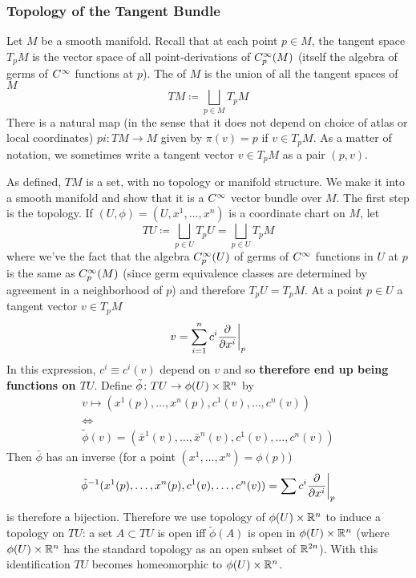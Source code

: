 \subsubsection{Topology of the Tangent Bundle}

Let \(M\) be a smooth manifold.
Recall that at each point \(p \in M\), the tangent space \(T_p M\) is the vector space of all point-derivations of \(C^\infty_p (M)\) (itself the algebra of germs of \(C^\infty\) functions at \(p\)).
The  of \(M\) is the union of all the tangent spaces of \(M\)
\[
    TM \coloneqq \bigsqcup_{p \in M} T_p M
\]
There is a natural map (in the sense that it does not depend on choice of atlas or local coordinates) \(pi \colon TM \rightarrow M\) given by \(\pi(v) = p\) if \(v \in T_p M\).
As a matter of notation, we sometimes write a tangent vector \(v \in T_p M\) as a pair \((p, v)\).

As defined, \(TM\) is a set, with no topology or manifold structure.
We make it into a smooth manifold and show that it is a \(C^\infty\) vector bundle over \(M\).
The first step is the topology.
If \((U, \phi) = (U, x^1, \dots, x^n)\) is a coordinate chart on \(M\), let
\[
    TU \coloneqq \bigsqcup_{p \in U} T_p U = \bigsqcup_{p \in U} T_p M
\]
where we've the fact that the algebra \(C^\infty_p (U)\) of germs of \(C^\infty\) functions in \(U\) at \(p\) is the same as \(C^\infty_p (M)\) (since germ equivalence classes are determined by agreement in a neighborhood of \(p\)) and therefore \(T_p U = T_p M\).
At a point \(p \in U\) a tangent vector \(v \in T_p M\)
\[
    v = \sum_{i=1}^n c^i \evalat[\bigg]{\pdv{x^i}}{p}
\]
In this expression, \(c^i \equiv c^i(v)\) depend on \(v\) and so \textbf{therefore end up being functions on \(TU\)}.
Define \(\tilde{\phi} \colon TU \rightarrow \phi(U) \times \mathbb{R}^n\) by
\begin{gather}
    v \mapsto (x^1(p), \dots, x^n(p), c^1(v), \dots, c^n(v)) \\
    \iff \\
    \tilde{\phi}(v) = (\bar{x}^1 (v), \dots, \bar{x}^n(v), c^1(v), \dots, c^n (v)) \label{eqn:bundlechart}
\end{gather}
Then \(\bar{\phi}\) has an inverse (for a point \((x^1, \dots, x^n) = \phi(p)\))
\[
    \tilde{\phi}^{-1}(x^1(p), \dots, x^n(p), c^1(v), \dots, c^n(v)) = \sum c^i \evalat[\bigg]{\pdv{x^i}}{p}
\]
is therefore a bijection.
Therefore we use topology of \(\phi(U) \times \mathbb{R}^n\) to induce a topology on \(TU\): a set \(A \subset TU\) is open iff \(\tilde{\phi}(A)\) is open in \(\phi(U) \times \mathbb{R}^n\) (where \(\phi(U) \times \mathbb{R}^n\) has the standard topology as an open subset of \(\mathbb{R}^{2n}\)).
With this identification \(TU\) becomes homeomorphic to \(\phi(U) \times \mathbb{R}^n\).

